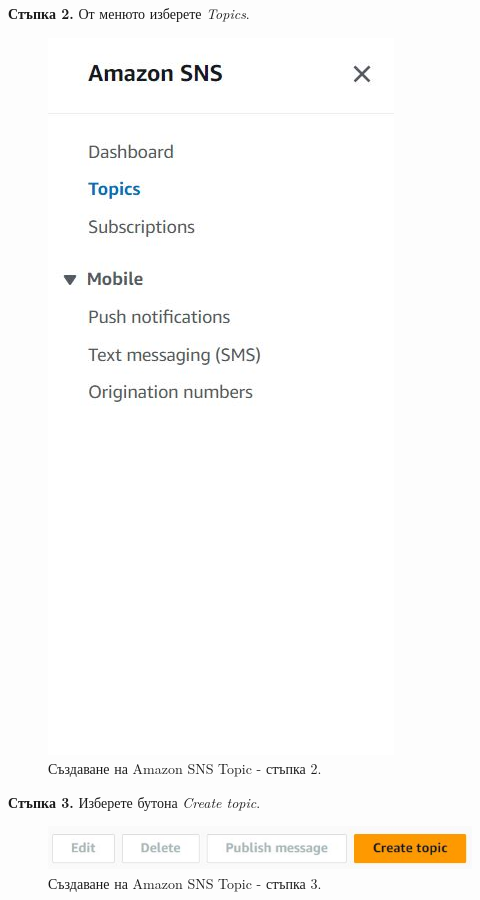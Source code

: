 \documentclass[12pt]{article}
\begin{document}
\noindent\textbf{Стъпка 2.} От менюто изберете \textit{Topics}.
\begin{figure}[h!]
\centering
    \includegraphics[scale=0.55]{instructions/sns/2.JPG}
  \caption{Създаване на Amazon SNS Topic - стъпка 2.}
\end{figure}

\noindent\textbf{Стъпка 3.} Изберете бутона \textit{Create topic}.
\begin{figure}[h!]
\centering
    \includegraphics[scale=0.6]{instructions/sns/3.JPG}
  \caption{Създаване на Amazon SNS Topic - стъпка 3.}
\end{figure}
\end{document}
